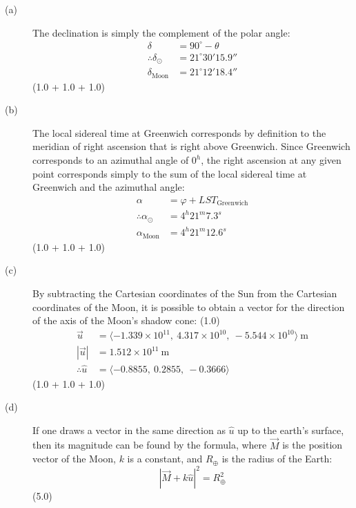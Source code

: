 \begin{description}
\item[(a)] The declination is simply the complement of the polar angle:
  \begin{align*}
    \delta &= 90^\circ - \theta\\
    \therefore \delta_\odot &= 21^\circ 30' 15.9''\\
    \delta_{\mathrm{Moon}} &= 21^\circ 12' 18.4''
  \end{align*}
  \hfill(1.0 + 1.0 + 1.0)

\item[(b)] The local sidereal time at Greenwich corresponds by definition to
  the meridian of right ascension that is right above Greenwich. Since
  Greenwich corresponds to an azimuthal angle of $0^h$, the right ascension at
  any given point corresponds simply to the sum of the local sidereal time at
  Greenwich and the azimuthal angle:
  \begin{align*}
    \alpha &= \varphi + LST_{\mathrm{Greenwich}}\\
    \therefore \alpha_\odot &= 4^h 21^m 7.3^s\\
    \alpha_{\mathrm{Moon}} &= 4^h 21^m 12.6^s
  \end{align*}
  \hfill(1.0 + 1.0 + 1.0)

\item[(c)] By subtracting the Cartesian coordinates of the Sun from the
  Cartesian coordinates of the Moon, it is possible to obtain a vector for the
  direction of the axis of the Moon's shadow cone:
  \hfill(1.0)
  \begin{align*}
    \vec{u} &= \langle -1.339 \times 10^{11},\ 4.317 \times 10^{10},\
                       -5.544 \times 10^{10} \rangle\ \mathrm{m}\\
    |\vec{u}| &= 1.512 \times 10^{11}\ \mathrm{m}\\
    \therefore \hat{u} &= \langle -0.8855,\ 0.2855,\ -0.3666 \rangle
  \end{align*}
  \hfill(1.0 + 1.0 + 1.0)

\item[(d)] If one draws a vector in the same direction as $\hat{u}$ up to the
  earth's surface, then its magnitude can be found by the formula, where
  $\vec{M}$ is the position vector of the Moon, $k$ is a constant, and
  $R_\oplus$ is the radius of the Earth:
  \[
    |\vec{M} + k\hat{u}|^2 = R_\oplus^2
  \]
  \hfill(5.0)


\end{description}

